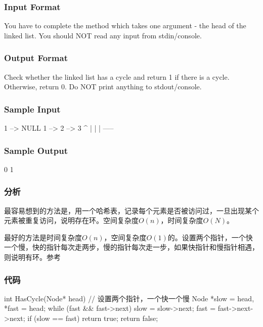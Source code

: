 \subsubsection{Input Format}
You have to complete the  method which takes one argument - the head of the linked list. You should NOT read any input from stdin/console.


\subsubsection{Output Format}
Check whether the linked list has a cycle and return 1 if there is a cycle. Otherwise, return 0. Do NOT print anything to stdout/console.


\subsubsection{Sample Input}
\begin{Code}
1 --> NULL
1 --> 2 --> 3
      ^     |
      |     |
       -----     
\end{Code}


\subsubsection{Sample Output}
\begin{Code}
0
1
\end{Code}


\subsubsection{分析}
最容易想到的方法是，用一个哈希表，记录每个元素是否被访问过，一旦出现某个元素被重复访问，说明存在环。空间复杂度$O(n)$，时间复杂度$O(N)$。

最好的方法是时间复杂度$O(n)$，空间复杂度$O(1)$的。设置两个指针，一个快一个慢，快的指针每次走两步，慢的指针每次走一步，如果快指针和慢指针相遇，则说明有环。参考


\subsubsection{代码}
\begin{Code}
int HasCycle(Node* head) {
    // 设置两个指针，一个快一个慢
    Node *slow = head, *fast = head;
    while (fast && fast->next) {
        slow = slow->next;
        fast = fast->next->next;
        if (slow == fast) return true;
    }
    return false;
}
\end{Code}


